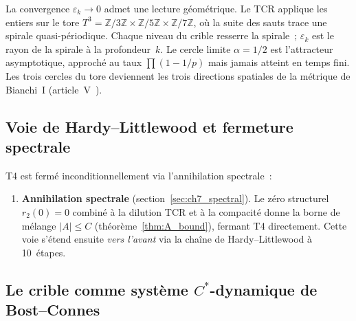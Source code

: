 \documentclass[12pt,a4paper]{article}
\begin{document}
\begin{remarque}
\label{rem:toric_spiral}
La convergence $\varepsilon_k \to 0$ admet une lecture géométrique.
Le TCR applique les entiers sur le tore
$T^3 = \mathbb{Z}/3\mathbb{Z} \times \mathbb{Z}/5\mathbb{Z} \times
\mathbb{Z}/7\mathbb{Z}$, où la suite des sauts trace une spirale
quasi-périodique. Chaque niveau du crible resserre la spirale~;
$\varepsilon_k$ est le rayon de la spirale à la profondeur~$k$.
Le cercle limite $\alpha = 1/2$ est l'attracteur asymptotique,
approché au taux $\prod(1 - 1/p)$ mais jamais atteint en temps fini.
Les trois cercles du tore deviennent les trois directions spatiales
de la métrique de Bianchi~I (article~V~\cite{companion_M5}).
\end{remarque}

\subsection{Voie de Hardy--Littlewood et fermeture spectrale}
\label{sec:ch7_HL}

T4 est fermé inconditionnellement via l'annihilation spectrale~:

\begin{enumerate}[leftmargin=3em]
\item \textbf{Annihilation spectrale} (section~\ref{sec:ch7_spectral}).
  Le zéro structurel $r_2(0) = 0$ combiné à la dilution TCR et à la
  compacité donne la borne de mélange $|A| \leq C$
  (théorème~\ref{thm:A_bound}), fermant T4 directement.
  Cette voie s'étend ensuite \emph{vers l'avant} via la chaîne de
  Hardy--Littlewood à 10~étapes.
\end{enumerate}

\subsection{Le crible comme système $C^*$-dynamique de Bost--Connes}
\label{sec:ch7_bost_connes}
\end{document}
